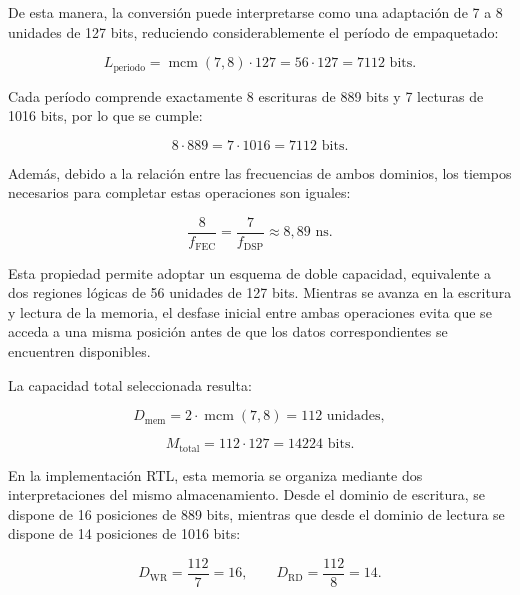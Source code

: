 \documentclass[10pt,a4paper]{article}
\begin{document}
De esta manera, la conversión puede interpretarse como una
adaptación de 7 a 8 unidades de 127 bits, reduciendo
considerablemente el período de empaquetado:

\begin{equation}
    L_{\mathrm{periodo}}
    =
    \operatorname{mcm}(7,8)\cdot127
    =
    56\cdot127
    =
    7112\text{ bits}.
\end{equation}

Cada período comprende exactamente 8 escrituras de 889 bits
y 7 lecturas de 1016 bits, por lo que se cumple:

\begin{equation}
    8\cdot889=7\cdot1016=7112\text{ bits}.
\end{equation}

Además, debido a la relación entre las frecuencias de ambos
dominios, los tiempos necesarios para completar estas operaciones
son iguales:

\begin{equation}
    \frac{8}{f_{\mathrm{FEC}}}
    =
    \frac{7}{f_{\mathrm{DSP}}}
    \approx 8{,}89\text{ ns}.
\end{equation}

Esta propiedad permite adoptar un esquema de doble capacidad,
equivalente a dos regiones lógicas de 56 unidades de 127 bits.
Mientras se avanza en la escritura y lectura de la memoria,
el desfase inicial entre ambas operaciones evita que se acceda
a una misma posición antes de que los datos correspondientes
se encuentren disponibles.

La capacidad total seleccionada resulta:

\begin{equation}
    D_{\mathrm{mem}}
    =
    2\cdot\operatorname{mcm}(7,8)
    =
    112\text{ unidades},
\end{equation}

\begin{equation}
    M_{\mathrm{total}}
    =
    112\cdot127
    =
    14224\text{ bits}.
    \label{eq:memoria-gearbox}
\end{equation}

En la implementación RTL, esta memoria se organiza mediante dos
interpretaciones del mismo almacenamiento. Desde el dominio de
escritura, se dispone de 16 posiciones de 889 bits, mientras que
desde el dominio de lectura se dispone de 14 posiciones de
1016 bits:

\begin{equation}
    D_{\mathrm{WR}}
    =
    \frac{112}{7}=16,
    \qquad
    D_{\mathrm{RD}}
    =
    \frac{112}{8}=14.
\end{equation}
\end{document}
